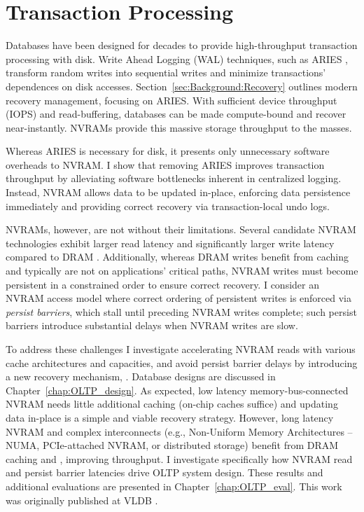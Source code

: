 \section{Transaction Processing}
\label{sec:Intro:OLTP}

Databases have been designed for decades to provide high-throughput transaction processing with disk.
Write Ahead Logging (WAL) techniques, such as ARIES \cite{MohanHaderle92}, transform random writes into sequential writes and minimize transactions' dependences on disk accesses.
Section~\ref{sec:Background:Recovery} outlines modern recovery management, focusing on ARIES.
With sufficient device throughput (IOPS) and read-buffering, databases can be made compute-bound and recover near-instantly.
NVRAMs provide this massive storage throughput to the masses.

Whereas ARIES is necessary for disk, it presents only unnecessary software overheads to NVRAM.
I show that removing ARIES improves transaction throughput by alleviating software bottlenecks inherent in centralized logging.
Instead, NVRAM allows data to be updated in-place, enforcing data persistence immediately and providing correct recovery via transaction-local undo logs.

NVRAMs, however, are not without their limitations.
Se\-veral candidate NVRAM technologies exhibit larger read latency and significantly larger write latency compared to DRAM \cite{BurrKurdi08}.
Additionally, whereas DRAM writes benefit from caching and typically are not on applications' critical paths, NVRAM writes must become persistent in a constrained order to ensure correct recovery.
I consider an NVRAM access model where correct ordering of persistent writes is enforced via \emph{persist barriers}, which stall until preceding NVRAM writes complete; such persist barriers introduce substantial delays when NVRAM writes are slow.

To address these challenges I investigate accelerating NVRAM reads with various cache architectures and capacities, and avoid persist barrier delays by introducing a new recovery mechanism, \GroupCommit.
Database designs are discussed in Chapter~\ref{chap:OLTP_design}.
As expected, low latency memory-bus-connected NVRAM needs little additional caching (on-chip caches suffice) and updating data in-place is a simple and viable recovery strategy.
However, long latency NVRAM and complex interconnects (e.g., Non-Uniform Memory Architectures -- NUMA, PCIe-attached NVRAM, or distributed storage) benefit from DRAM caching and \GroupCommit, improving throughput.
I investigate specifically how NVRAM read and persist barrier latencies drive OLTP system design.
These results and additional evaluations are presented in Chapter~\ref{chap:OLTP_eval}.
This work was originally published at VLDB \cite{Pelley13}.

